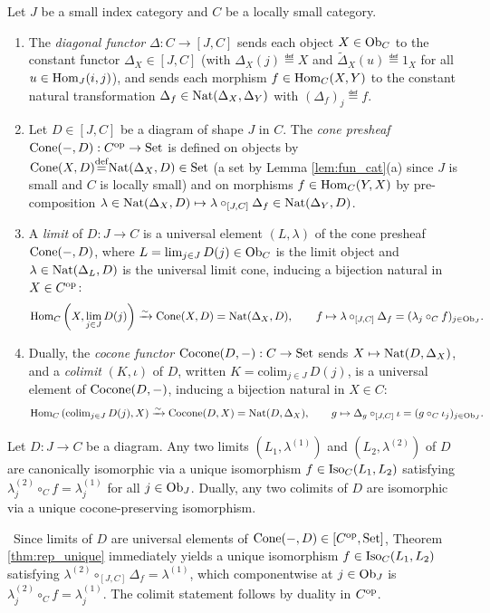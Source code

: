 \documentclass[10pt,a4paper]{article}
\begin{document}
\begin{definition}\label{def:limits}
Let $J$ be a small index category and $C$ be a locally small category.
\begin{enumerate}
\item The \emph{diagonal functor} $\Delta : C \to [J, C]$ sends each object $X \in {\textrm{Ob}}_C$ to the constant functor $\Delta_X \in [J, C]$ (with $\Delta_X(j) \eqdef X$ and $\widetilde{\Delta}_X(u) \eqdef 1_X$ for all $u \in {\textrm{Hom}}_J(i, j)$), and sends each morphism $f \in {\textrm{Hom}}_C(X, Y)$ to the constant natural transformation $\Delta_f \in {\textrm{Nat}}(\Delta_X, \Delta_Y)$ with $(\Delta_f)_j \eqdef f$.
\item Let $D \in [J, C]$ be a diagram of shape $J$ in $C$. The \emph{cone presheaf} ${\mathrm{Cone}}(-, D) : C^{\textrm{op}} \to {\textrm{Set}}$ is defined on objects by ${\mathrm{Cone}}(X, D) {\stackrel{{\textrm{def}}}{=}} {\textrm{Nat}}(\Delta_X, D) \in {\textrm{Set}}$ (a set by Lemma \ref{lem:fun_cat}(a) since $J$ is small and $C$ is locally small) and on morphisms $f \in {\textrm{Hom}}_C(Y, X)$ by pre-composition $\lambda \in {\textrm{Nat}}(\Delta_X, D) \mapsto \lambda \circ_{[J,C]} \Delta_f \in {\textrm{Nat}}(\Delta_Y, D)$.
\item A \emph{limit} of $D : J \to C$ is a universal element $(L, \lambda)$ of the cone presheaf ${\mathrm{Cone}}(-, D)$, where $L = \lim_{j \in J} D(j) \in {\textrm{Ob}}_C$ is the limit object and $\lambda \in {\textrm{Nat}}(\Delta_L, D)$ is the universal limit cone, inducing a bijection natural in $X \in C^{\textrm{op}}$:
$${\textrm{Hom}}_C\left(X, \lim_{j \in J} D(j)\right) \xrightarrow{\sim} {\mathrm{Cone}}(X, D) = {\textrm{Nat}}(\Delta_X, D), \qquad f \mapsto \lambda \circ_{[J,C]} \Delta_f = (\lambda_j \circ_C f)_{j \in {\textrm{Ob}}_J}.$$
\item Dually, the \emph{cocone functor} ${\mathrm{Cocone}}(D, -) : C \to {\textrm{Set}}$ sends $X \mapsto {\textrm{Nat}}(D, \Delta_X)$, and a \emph{colimit} $(K, \iota)$ of $D$, written $K = \mathrm{colim}_{j \in J}\, D(j)$, is a universal element of ${\mathrm{Cocone}}(D, -)$, inducing a bijection natural in $X \in C$:
$${\textrm{Hom}}_C\left(\mathrm{colim}_{j \in J}\, D(j), X\right) \xrightarrow{\sim} {\mathrm{Cocone}}(D, X) = {\textrm{Nat}}(D, \Delta_X), \qquad g \mapsto \Delta_g \circ_{[J,C]} \iota = (g \circ_C \iota_j)_{j \in {\textrm{Ob}}_J}.$$
\end{enumerate}
\end{definition}

\begin{theorem}\label{thm:limit_unique}
Let $D : J \to C$ be a diagram. Any two limits $(L_1, \lambda^{(1)})$ and $(L_2, \lambda^{(2)})$ of $D$ are canonically isomorphic via a unique isomorphism $f \in {\mathrm{Iso}}_C(L_1, L_2)$ satisfying $\lambda^{(2)}_j \circ_C f = \lambda^{(1)}_j$ for all $j \in {\textrm{Ob}}_J$. Dually, any two colimits of $D$ are isomorphic via a unique cocone-preserving isomorphism.
\end{theorem}
\myprf\ Since limits of $D$ are universal elements of ${\mathrm{Cone}}(-, D) \in [C^{\textrm{op}}, {\textrm{Set}}]$, Theorem \ref{thm:rep_unique} immediately yields a unique isomorphism $f \in {\mathrm{Iso}}_C(L_1, L_2)$ satisfying $\lambda^{(2)} \circ_{[J,C]} \Delta_f = \lambda^{(1)}$, which componentwise at $j \in {\textrm{Ob}}_J$ is $\lambda^{(2)}_j \circ_C f = \lambda^{(1)}_j$. The colimit statement follows by duality in $C^{\textrm{op}}$. \myqed
\end{document}
